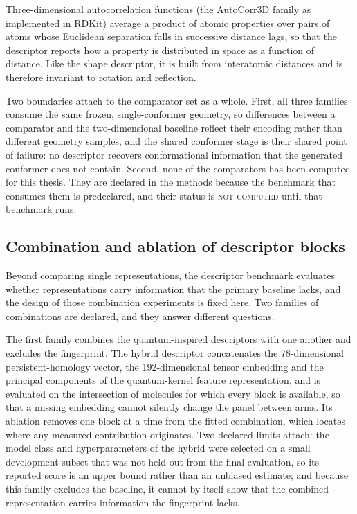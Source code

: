 Three-dimensional autocorrelation functions (the AutoCorr3D family as implemented in RDKit\cite{LandrumRDKit}) average a product of atomic properties over pairs of atoms whose Euclidean separation falls in successive distance lags, so that the descriptor reports how a property is distributed in space as a function of distance. Like the shape descriptor, it is built from interatomic distances and is therefore invariant to rotation and reflection.

Two boundaries attach to the comparator set as a whole. First, all three families consume the same frozen, single-conformer geometry, so differences between a comparator and the two-dimensional baseline reflect their encoding rather than different geometry samples, and the shared conformer stage is their shared point of failure: no descriptor recovers conformational information that the generated conformer does not contain. Second, none of the comparators has been computed for this thesis. They are declared in the methods because the benchmark that consumes them is predeclared, and their status is \textsc{not computed} until that benchmark runs.

\subsection{Combination and ablation of descriptor blocks}\label{sec:combination_methods}

Beyond comparing single representations, the descriptor benchmark evaluates whether representations carry information that the primary baseline lacks, and the design of those combination experiments is fixed here. Two families of combinations are declared, and they answer different questions.

The first family combines the quantum-inspired descriptors with one another and excludes the fingerprint. The hybrid descriptor concatenates the \num{78}-dimensional persistent-homology vector, the \num{192}-dimensional tensor embedding and the principal components of the quantum-kernel feature representation, and is evaluated on the intersection of molecules for which every block is available, so that a missing embedding cannot silently change the panel between arms. Its ablation removes one block at a time from the fitted combination, which locates where any measured contribution originates. Two declared limits attach: the model class and hyperparameters of the hybrid were selected on a small development subset that was not held out from the final evaluation, so its reported score is an upper bound rather than an unbiased estimate; and because this family excludes the baseline, it cannot by itself show that the combined representation carries information the fingerprint lacks.


